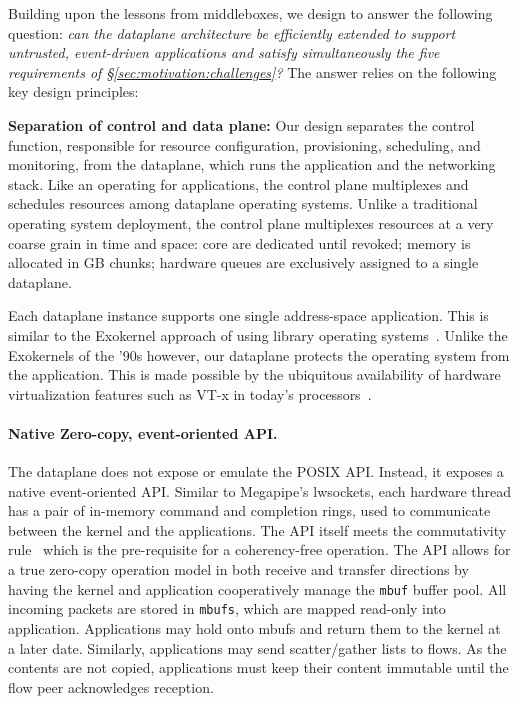 
Building upon the lessons from middleboxes, we design \ix to answer
the following question: {\it can the dataplane architecture be
  efficiently extended to support untrusted, event-driven applications
  and satisfy simultaneously the five requirements of
  \S\ref{sec:motivation:challenges}?}  The answer relies on the
following key design principles:


{\bf Separation of control and data plane:} 
Our design separates the control function, responsible for resource
configuration, provisioning, scheduling, and monitoring, from the
dataplane, which runs the application and the networking stack.  Like
an operating for applications, the control plane multiplexes and
schedules resources among dataplane operating systems.  Unlike a
traditional operating system deployment, the control plane multiplexes
resources at a very coarse grain in time and space: core are dedicated
until revoked; memory is allocated in GB chunks; hardware queues are
exclusively assigned to a single dataplane.

Each dataplane instance supports one single address-space application.
This is similar to the Exokernel approach of using library operating
systems~\cite{DBLP:conf/sosp/EnglerKO95}.  Unlike the Exokernels of
the '90s however, our dataplane protects the operating system from the
application.  This is made possible by the ubiquitous availability of
hardware virtualization features such as VT-x in today's
processors~\cite{DBLP:journals/computer/UhligNRSMABKLS05}.


\paragraph{Native Zero-copy, event-oriented API.}

The dataplane does not expose or emulate the POSIX API.  Instead, it
exposes a native event-oriented API.  Similar to Megapipe's lwsockets,
each hardware thread has a pair of in-memory command and completion
rings, used to communicate between the kernel and the applications.
The API itself meets the commutativity
rule~\cite{DBLP:conf/sosp/ClementsKZMK13} which is the pre-requisite
for a coherency-free operation.  The API allows for a true zero-copy
operation model in both receive and transfer directions by having the
kernel and application cooperatively manage the \texttt{mbuf} buffer
pool.  All incoming packets are stored in \texttt{mbufs}, which are
mapped read-only into application.  Applications may hold onto mbufs
and return them to the kernel at a later date.  Similarly,
applications may send scatter/gather lists to flows. As the contents
are not copied, applications must keep their content immutable until
the flow peer acknowledges reception.

